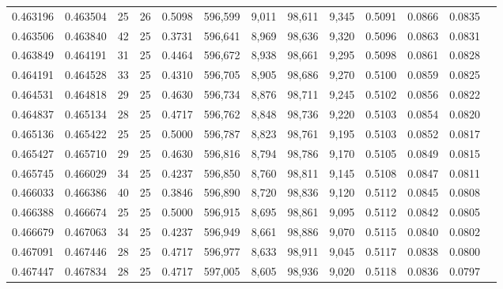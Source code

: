 \begin{tabular}{rrrrrrrrrrrrr}
0.463196 & 0.463504 &    25 &  26 &                                     0.5098 & 596,599 &   9,011 &  98,611 &   9,345 & 0.5091 & 0.0866 & 0.0835 \\
0.463506 & 0.463840 &    42 &  25 &                                     0.3731 & 596,641 &   8,969 &  98,636 &   9,320 & 0.5096 & 0.0863 & 0.0831 \\
0.463849 & 0.464191 &    31 &  25 &                                     0.4464 & 596,672 &   8,938 &  98,661 &   9,295 & 0.5098 & 0.0861 & 0.0828 \\
0.464191 & 0.464528 &    33 &  25 &                                     0.4310 & 596,705 &   8,905 &  98,686 &   9,270 & 0.5100 & 0.0859 & 0.0825 \\
0.464531 & 0.464818 &    29 &  25 &                                     0.4630 & 596,734 &   8,876 &  98,711 &   9,245 & 0.5102 & 0.0856 & 0.0822 \\
0.464837 & 0.465134 &    28 &  25 &                                     0.4717 & 596,762 &   8,848 &  98,736 &   9,220 & 0.5103 & 0.0854 & 0.0820 \\
0.465136 & 0.465422 &    25 &  25 &                                     0.5000 & 596,787 &   8,823 &  98,761 &   9,195 & 0.5103 & 0.0852 & 0.0817 \\
0.465427 & 0.465710 &    29 &  25 &                                     0.4630 & 596,816 &   8,794 &  98,786 &   9,170 & 0.5105 & 0.0849 & 0.0815 \\
0.465745 & 0.466029 &    34 &  25 &                                     0.4237 & 596,850 &   8,760 &  98,811 &   9,145 & 0.5108 & 0.0847 & 0.0811 \\
0.466033 & 0.466386 &    40 &  25 &                                     0.3846 & 596,890 &   8,720 &  98,836 &   9,120 & 0.5112 & 0.0845 & 0.0808 \\
0.466388 & 0.466674 &    25 &  25 &                                     0.5000 & 596,915 &   8,695 &  98,861 &   9,095 & 0.5112 & 0.0842 & 0.0805 \\
0.466679 & 0.467063 &    34 &  25 &                                     0.4237 & 596,949 &   8,661 &  98,886 &   9,070 & 0.5115 & 0.0840 & 0.0802 \\
0.467091 & 0.467446 &    28 &  25 &                                     0.4717 & 596,977 &   8,633 &  98,911 &   9,045 & 0.5117 & 0.0838 & 0.0800 \\
0.467447 & 0.467834 &    28 &  25 &                                     0.4717 & 597,005 &   8,605 &  98,936 &   9,020 & 0.5118 & 0.0836 & 0.0797 \\

\end{tabular}
